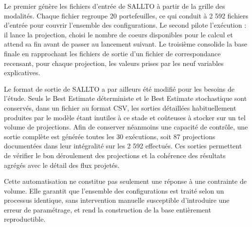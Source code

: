 Le premier génère les fichiers d'entrée de SALLTO à partir de la grille des modalités. Chaque fichier regroupe 20 portefeuilles, ce qui conduit à 2 592 fichiers d'entrée pour couvrir l'ensemble des configurations. Le second pilote l'exécution : il lance la projection, choisi le nombre de coeurs disponibles pour le calcul et attend sa fin avant de passer au lancement suivant. Le troisième consolide la base finale en rapprochant les fichiers de sortie d'un fichier de correspondance recensant, pour chaque projection, les valeurs prises par les neuf variables explicatives.

Le format de sortie de SALLTO a par ailleurs été modifié pour les besoins de l'étude. Seuls le Best Estimate déterministe et le Best Estimate stochastique sont conservés, dans un fichier au format CSV, les sorties détaillées habituellement produites par le modèle étant inutiles à ce stade et coûteuses à stocker sur un tel volume de projections. Afin de conserver néanmoins une capacité de contrôle, une sortie complète est générée toutes les 30 exécutions, soit 87 projections documentées dans leur intégralité sur les 2 592 effectués. Ces sorties permettent de vérifier le bon déroulement des projections et la cohérence des résultats agrégés avec le détail des flux projetés.

Cette automatisation ne constitue pas seulement une réponse à une contrainte de volume. Elle garantit que l'ensemble des configurations est traité selon un processus identique, sans intervention manuelle susceptible d'introduire une erreur de paramétrage, et rend la construction de la base entièrement reproductible. 